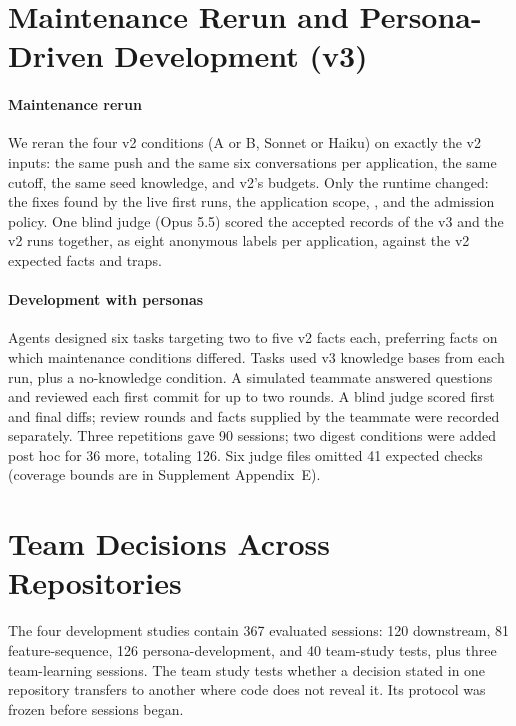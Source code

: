 \section{Maintenance Rerun and Persona-Driven Development (v3)}
\label{sec:v3-method}

\paragraph{Maintenance rerun} We reran the four v2 conditions (A or B, Sonnet or Haiku) on exactly the v2 inputs: the same push and the same six conversations per application, the same cutoff, the same seed knowledge, and v2's budgets. Only the runtime changed: the fixes found by the live first runs, the application scope, , and the admission policy. One blind judge (Opus 5.5) scored the accepted records of the v3 and the v2 runs together, as eight anonymous labels per application, against the v2 expected facts and traps.

\paragraph{Development with personas} Agents designed six tasks targeting two to five v2 facts each, preferring facts on which maintenance conditions differed. Tasks used v3 knowledge bases from each run, plus a no-knowledge condition. A simulated teammate answered questions and reviewed each first commit for up to two rounds. A blind judge scored first and final diffs; review rounds and facts supplied by the teammate were recorded separately. Three repetitions gave 90 sessions; two digest conditions were added post hoc for 36 more, totaling 126. Six judge files omitted 41 expected checks (coverage bounds are in Supplement Appendix~E).

\section{Team Decisions Across Repositories}
\label{sec:v4-method}

The four development studies contain 367 evaluated sessions: 120 downstream, 81 feature-sequence, 126 persona-development, and 40 team-study tests, plus three team-learning sessions. The team study tests whether a decision stated in one repository transfers to another where code does not reveal it. Its protocol was frozen before sessions began.

